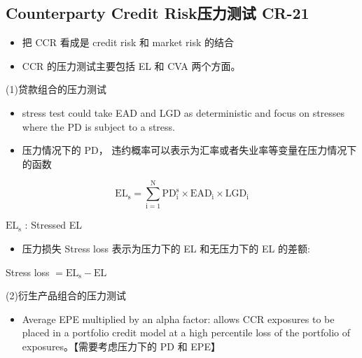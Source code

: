 \subsection{Counterparty Credit Risk压力测试 CR-21}






\begin{itemize}
    \item 把 CCR 看成是 credit risk 和 market risk 的结合
    \end{itemize}
    
    \begin{itemize}
    \item CCR 的压力测试主要包括 EL 和 CVA 两个方面。
    \end{itemize}
    
    (1)贷款组合的压力测试
    
    \begin{itemize}
    \item stress test could take EAD and LGD as deterministic and focus on stresses where the PD is subject to a stress.
    \end{itemize}
    
    \begin{itemize}
    \item 压力情况下的 PD， 违约概率可以表示为汇率或者失业率等变量在压力情况下的函数
    \end{itemize}
    
    \[
    {\mathrm{{EL}}}_{\mathrm{s}} = \mathop{\sum }\limits_{{\mathrm{i} = 1}}^{\mathrm{N}}{\mathrm{{PD}}}_{\mathrm{i}}^{\mathrm{s}} \times  {\mathrm{{EAD}}}_{\mathrm{i}} \times  {\mathrm{{LGD}}}_{\mathrm{i}}
    \]
    
    \({\mathrm{{EL}}}_{\mathrm{s}}\) : Stressed EL
    
    \begin{itemize}
    \item 压力损失 Stress loss 表示为压力下的 EL 和无压力下的 EL 的差额:
    \end{itemize}
    
    Stress loss \(= {\mathrm{{EL}}}_{\mathrm{s}} - \mathrm{{EL}}\)
    
    (2)衍生产品组合的压力测试
    
    \begin{itemize}
    \item Average EPE multiplied by an alpha factor: allows CCR exposures to be placed in a portfolio credit model at a high percentile loss of the portfolio of exposures。【需要考虑压力下的 PD 和 EPE】
    \end{itemize}
    
